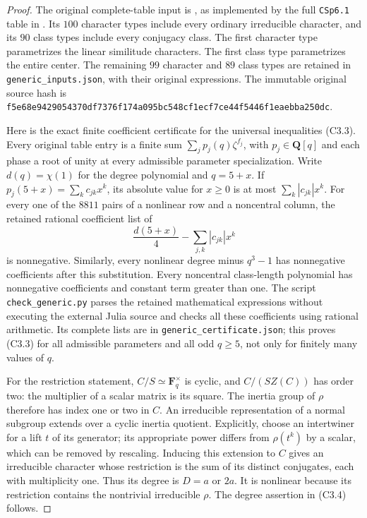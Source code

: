 \begin{proof}
The original complete-table input is
\cite[Introduction, pp.~3--4; \S2.2, pp.~18--21;
\S9, pp.~78--79]{C3:Luebeck}, as implemented by the full
\texttt{CSp6.1} table in \cite{C3:GCT}.
Its $100$ character types include every ordinary irreducible
character, and its $90$ class types include every conjugacy class.
The first character type parametrizes the linear similitude
characters. The first class type parametrizes the entire center.
The remaining $99$ character and $89$ class types are retained in
\texttt{generic\_inputs.json}, with their original expressions.
The immutable original source hash is
\texttt{f5e68e9429054370df7376f174a095bc548cf1ecf7ce44f5446f1eaebba250dc}.

Here is the exact finite coefficient certificate for the universal
inequalities (C3.3). Every original table entry is a finite sum
$\sum_j p_j(q)\zeta^{f_j}$, with $p_j\in\mathbf Q[q]$ and each
phase a root of unity at every admissible parameter specialization.
Write $d(q)=\chi(1)$ for the degree polynomial and $q=5+x$. If
$p_j(5+x)=\sum_k c_{jk}x^k$, its absolute value for $x\ge0$ is at
most $\sum_k|c_{jk}|x^k$. For every one of the $8811$ pairs of a
nonlinear row and a noncentral column, the retained rational
coefficient list of
\[
 \frac{d(5+x)}4-\sum_{j,k}|c_{jk}|x^k
                                                               \tag{C3.5}
\]
is nonnegative. Similarly, every nonlinear degree minus $q^3-1$
has nonnegative coefficients after this substitution. Every
noncentral class-length polynomial has nonnegative coefficients
and constant term greater than one. The script
\texttt{check\_generic.py} parses the retained mathematical
expressions without executing the external Julia source and
checks all these coefficients using rational arithmetic. Its
complete lists are in \texttt{generic\_certificate.json}; this
proves (C3.3) for all admissible parameters and all odd $q\ge5$,
not only for finitely many values of $q$.

For the restriction statement, $C/S\simeq\mathbf F_q^\times$
is cyclic, and $C/(SZ(C))$ has order two: the multiplier of a
scalar matrix is its square. The inertia group of $\rho$ therefore
has index one or two in $C$. An irreducible representation of a
normal subgroup extends over a cyclic inertia quotient. Explicitly,
choose an intertwiner for a lift $t$ of its generator; its appropriate
power differs from $\rho(t^k)$ by a scalar, which can be removed by
rescaling. Inducing this extension to $C$ gives an irreducible
character whose restriction is the sum of its distinct conjugates,
each with multiplicity one. Thus its degree is $D=a$ or $2a$.
It is nonlinear because its restriction contains the nontrivial
irreducible $\rho$. The degree assertion in (C3.4) follows.


\end{proof}
